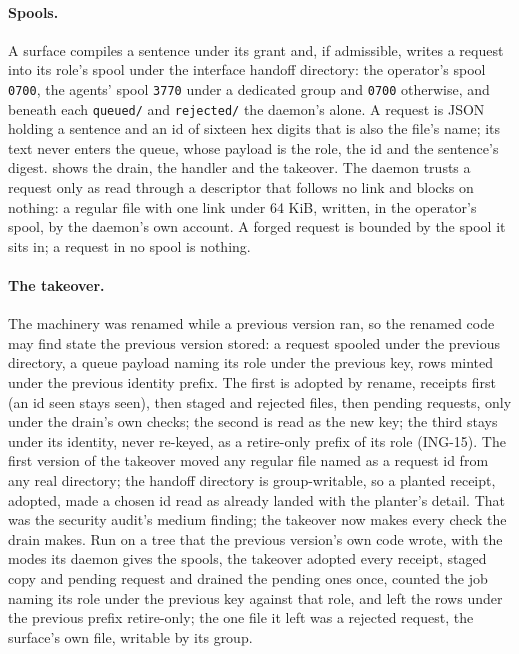 \documentclass[11pt]{article}
\theoremstyle{plain}
\theoremstyle{definition}
\theoremstyle{remark}
\newcommand{\code}[1]{\texttt{#1}}
\newcommand{\ing}[1]{ING-#1}
\begin{document}
\paragraph{Spools.}
A surface compiles a sentence under its grant and, if admissible, writes a request into its
role's spool under the interface handoff directory: the operator's spool \code{0700}, the
agents' spool \code{3770} under a dedicated group and \code{0700} otherwise, and beneath each
\code{queued/} and \code{rejected/} the daemon's alone. A request is JSON holding a sentence and
an id of sixteen hex digits that is also the file's name; its text never enters the queue, whose
payload is the role, the id and the sentence's digest.  shows the drain, the
handler and the takeover. The daemon trusts a request only as read through a descriptor that
follows no link and blocks on nothing: a regular file with one link under 64 KiB, written, in
the operator's spool, by the daemon's own account. A forged request is bounded by the spool it
sits in; a request in no spool is nothing.

\paragraph{The takeover.}
The machinery was renamed while a previous version ran, so the renamed code may find state the
previous version stored: a request spooled under the previous directory, a queue payload naming
its role under the previous key, rows minted under the previous identity prefix. The first is
adopted by rename, receipts first (an id seen stays seen), then staged and rejected files, then
pending requests, only under the drain's own checks; the second is read as the new key; the
third stays under its identity, never re-keyed, as a retire-only prefix of its role (\ing{15}).
The first version of the takeover moved any regular file named as a request id from any real
directory; the handoff directory is group-writable, so a planted receipt, adopted, made a chosen
id read as already landed with the planter's detail. That was the security audit's medium
finding; the takeover now makes every check the drain makes. Run on a tree that the previous
version's own code wrote, with the modes its daemon gives the spools, the takeover adopted
every receipt, staged copy and pending request and drained the pending ones once, counted the
job naming its role under the previous key against that role, and left the rows under the
previous prefix retire-only; the one file it left was a rejected request, the surface's own
file, writable by its group.
\end{document}
